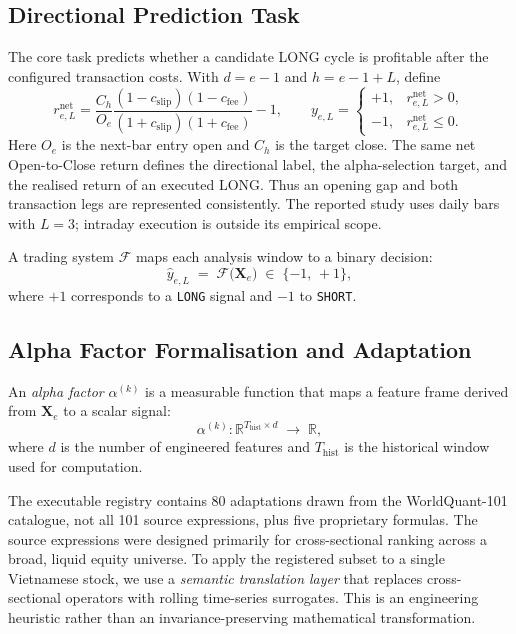 \subsection{Directional Prediction Task}

The core task predicts whether a candidate LONG cycle is profitable after
the configured transaction costs. With $d=e-1$ and $h=e-1+L$, define
\begin{equation}
    r^{\mathrm{net}}_{e,L}
    =\frac{C_h}{O_e}
      \frac{(1-c_{\mathrm{slip}})(1-c_{\mathrm{fee}})}
           {(1+c_{\mathrm{slip}})(1+c_{\mathrm{fee}})}-1,
    \qquad
    y_{e,L}=
    \begin{cases}
        +1, & r^{\mathrm{net}}_{e,L}>0,\\
        -1, & r^{\mathrm{net}}_{e,L}\leq 0.
    \end{cases}
    \label{eq:label}
\end{equation}
Here $O_e$ is the next-bar entry open and $C_h$ is the target close. The same
net Open-to-Close return defines the directional label, the alpha-selection
target, and the realised return of an executed LONG. Thus an opening gap and
both transaction legs are represented consistently. The reported study uses
daily bars with $L=3$; intraday execution is outside its empirical scope.

A trading system $\mathcal{F}$ maps each analysis window to a binary
decision:
\begin{equation}
    \hat{y}_{e,L} \;=\; \mathcal{F}\!\bigl(\mathbf{X}_e\bigr)
    \;\in\; \{-1,\, +1\},
\end{equation}
where $+1$ corresponds to a \texttt{LONG} signal and $-1$ to
\texttt{SHORT}.

\subsection{Alpha Factor Formalisation and Adaptation}

An \emph{alpha factor} $\alpha^{(k)}$ is a measurable function that maps
a feature frame derived from $\mathbf{X}_e$ to a scalar signal:
\begin{equation}
    \alpha^{(k)} : \mathbb{R}^{T_{\mathrm{hist}} \times d}
    \;\longrightarrow\; \mathbb{R},
\end{equation}
where $d$ is the number of engineered features and
$T_{\mathrm{hist}}$ is the historical window used for computation.

The executable registry contains 80 adaptations drawn from the WorldQuant-101 catalogue, not all 101 source expressions, plus five proprietary formulas. The source expressions were designed primarily for cross-sectional ranking across a broad, liquid equity universe. To apply the registered subset to a single Vietnamese stock, we use a \emph{semantic translation layer} that replaces cross-sectional operators with rolling time-series surrogates. This is an engineering heuristic rather than an invariance-preserving mathematical transformation.

